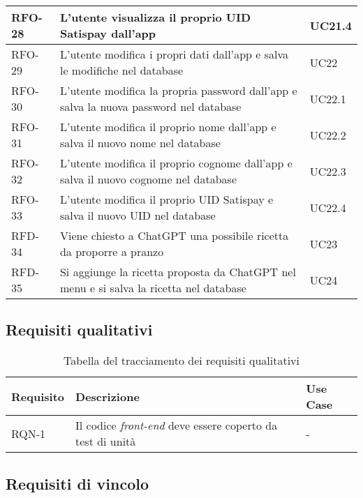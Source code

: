 \begin{table}
\begin{tabularx}{\textwidth}{lXl}
\hline
RFO-28    & L'utente visualizza il proprio UID Satispay dall'app & UC21.4 \\
\hline
RFO-29    & L'utente modifica i propri dati dall'app e salva le modifiche nel database & UC22 \\
\hline
RFO-30    & L'utente modifica la propria password dall'app e salva la nuova password nel database & UC22.1 \\
\hline
RFO-31    & L'utente modifica il proprio nome dall'app e salva il nuovo nome nel database & UC22.2 \\
\hline
RFO-32    & L'utente modifica il proprio cognome dall'app e salva il nuovo cognome nel database & UC22.3 \\
\hline
RFO-33    & L'utente modifica il proprio UID Satispay e salva il nuovo UID nel database & UC22.4 \\
\hline
RFD-34    & Viene chiesto a ChatGPT una possibile ricetta da proporre a pranzo & UC23 \\
\hline
RFD-35    & Si aggiunge la ricetta proposta da ChatGPT nel menu e si salva la ricetta nel database & UC24 \\
\hline
\end{tabularx}
\end{table}%

\newpage

\subsection{Requisiti qualitativi}

\begin{table}[htb]%
\caption{Tabella del tracciamento dei requisiti qualitativi}
\label{tab:requisiti-qualitativi}
\begin{tabularx}{\textwidth}{lXl}
\hline
\textbf{Requisito} & \textbf{Descrizione} & \textbf{Use Case}\\
\hline\hline
RQN-1    & Il codice \emph{front-end} deve essere coperto da test di unità & - \\
\hline
\end{tabularx}
\end{table}%

\subsection{Requisiti di vincolo}

